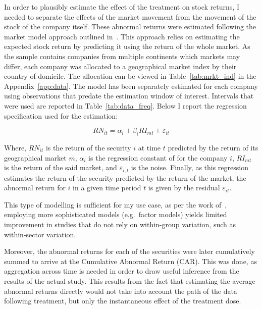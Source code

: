 \documentclass[12pt]{article}
\begin{document}

In order to plausibly estimate the effect of the treatment on stock returns, I needed to separate the effects of the market movement from the movement of the stock of the company itself. These abnormal returns were estimated following the market model approach outlined in~\textcite{mackinlayEventStudiesEconomics1997}. This approach relies on estimating the expected stock return by predicting it using the return of the whole market. As the sample contains companies from multiple continents which markets may differ, each company was allocated to a geographical market index by their country of domicile. The allocation can be viewed in Table~\ref{tab:mrkt_ind} in the Appendix~\ref{app:data}. The model has been separately estimated for each company using observations that predate the estimation window of interest. Intervals that were used are reported in Table~\ref{tab:data_freq}. Below I report the regression specification used for the estimation:

\begin{equation}\label{eq:reg_market_model}
    RN_{it} = \alpha_i + \beta_{i} RI_{mt} + \varepsilon_{it}
\end{equation}

Where, $RN_{it}$ is the return of the security $i$ at time $t$ predicted by the return of its geographical market $m$, $\alpha_i$ is the regression constant of for the company $i$, $RI_{mt}$ is the return of the said market, and $\varepsilon_{i,t}$ is the noise. Finally, as this regression estimates the return of the security predicted by the return of the market, the abnormal return for $i$ in a given time period $t$ is given by the residual $\varepsilon_{it}$.

This type of modelling is sufficient for my use case, as per the work of~\citeauthor{mackinlayEventStudiesEconomics1997}, employing more sophisticated models (e.g.~factor models) yields limited improvement in studies that do not rely on within-group variation, such as within-sector variation.

Moreover, the abnormal returns for each of the securities were later cumulatively summed to arrive at the Cumulative Abnormal Return (CAR). This was done, as aggregation across time is needed in order to draw useful inference from the results of the actual study. This results from the fact that estimating the average abnormal returns directly would not take into account the path of the data following treatment, but only the instantaneous effect of the treatment dose. 
\end{document}
